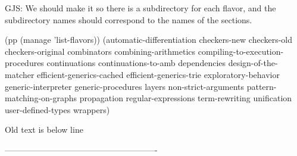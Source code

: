
GJS:
  We should make it so there is a subdirectory for each flavor, and the
  subdirectory names should correspond to the names of the sections.

(pp (manage 'list-flavors))
(automatic-differentiation
 checkers-new
 checkers-old
 checkers-original
 combinators
 combining-arithmetics
 compiling-to-execution-procedures
 continuations
 continuations-to-amb
 dependencies
 design-of-the-matcher
 efficient-generics-cached
 efficient-generics-trie
 exploratory-behavior
 generic-interpreter
 generic-procedures
 layers
 non-strict-arguments
 pattern-matching-on-graphs
 propagation
 regular-expressions
 term-rewriting
 unification
 user-defined-types
 wrappers)


Old text is below line

-------------------------------------------------------


